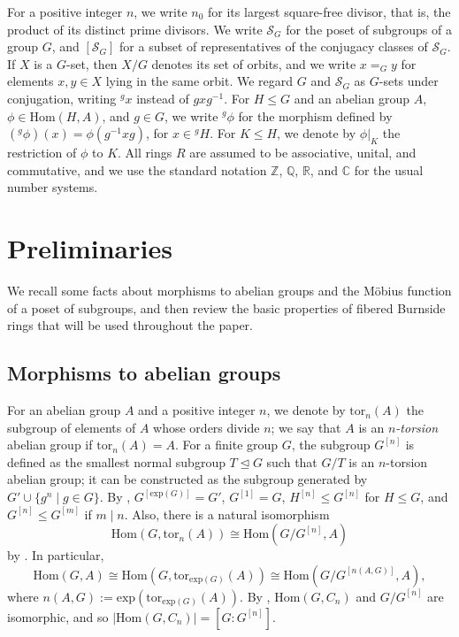 \documentclass[letterpaper,12pt]{article}
\theoremstyle{plain}
\theoremstyle{definition}
\newcommand{\SG}{\mathcal{S}_G}
\begin{document}
For a positive integer $n$, we write $n_0$ for its largest square-free divisor, that is, the product of its distinct prime divisors. We write $\mathcal{S}_G$ for the poset of subgroups of a group $G$, and $[\mathcal{S}_G]$ for a subset of representatives of the conjugacy classes of $\SG$. If $X$ is a $G$-set, then $X/G$ denotes its set of orbits, and we write $x=_G y$ for elements $x,y\in X$ lying in the same orbit. We regard $G$ and $\mathcal{S}_G$ as $G$-sets under conjugation, writing ${}^g x$ instead of $gxg^{-1}$. For $H\leq G$ and an abelian group $A$, $\phi\in\mathrm{Hom}(H,A)$, and $g\in G$, we write ${}^g\phi$ for the morphism defined by $({}^g\phi)(x)=\phi(g^{-1}xg)$, for $x\in {}^gH$. For $K\leq H$, we denote by $\phi|_K$ the restriction of $\phi$ to $K$. All rings $R$ are assumed to be associative, unital, and commutative, and we use the standard notation $\mathbb{Z}$, $\mathbb{Q}$, $\mathbb{R}$, and $\mathbb{C}$ for the usual number systems.


\section{Preliminaries}

We recall some facts about morphisms to abelian groups and the Möbius function of a poset of subgroups, and then review the basic properties of fibered Burnside rings that will be used throughout the paper.

\subsection{Morphisms to abelian groups}

For an abelian group $A$ and a positive integer $n$, we denote by $\mathrm{tor}_n(A)$ the subgroup of elements of $A$ whose orders divide $n$; we say that $A$ is an \textit{$n$-torsion} abelian group if $\mathrm{tor}_n(A)=A$. For a finite group $G$, the subgroup $G^{[n]}$ is defined as the smallest normal subgroup $T\unlhd G$ such that $G/T$ is an $n$-torsion abelian group; it can be constructed as the subgroup generated by $G'\cup \{g^n \mid g\in G\}$. By \cite[Lemma 1.1]{GarRag}, $G^{[\mathrm{exp}(G)]}=G'$, $G^{[1]}=G$, $H^{[n]}\leq G^{[n]}$ for $H\leq G$, and $G^{[n]}\leq G^{[m]}$ if $m\mid n$. Also, there is a natural isomorphism 
$$\mathrm{Hom}\left(G,\mathrm{tor}_n(A)\right) \cong \mathrm{Hom}\left(G/G^{[n]},A\right)$$
by \cite[Lemma 1.2]{GarRag}. In particular,
$$\mathrm{Hom}\left(G,A\right)\cong \mathrm{Hom}\left(G,\mathrm{tor}_{\mathrm{exp}(G)}(A)\right) \cong\mathrm{Hom}\left(G/G^{[n(A,G)]},A\right),$$
where $n(A,G):=\mathrm{exp}\left(\mathrm{tor}_{\mathrm{exp}(G)}(A)\right)$. By \cite[Lemma 1.3]{GarRag}, $\mathrm{Hom}(G,C_n)$ and $G/G^{[n]}$ are isomorphic, and so $\left|\mathrm{Hom}(G,C_n)\right|=\left[G:G^{[n]}\right]$. 
\end{document}
